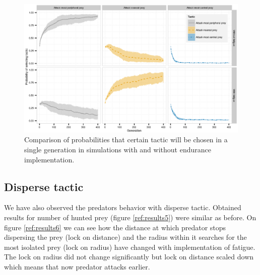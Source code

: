 \documentclass[internal]{FRIreport}
\begin{document}
\begin{figure}[H]
\centering
\includegraphics[scale=0.75]{tactics_graph.eps}
\caption{Comparison of probabilities that certain tactic will be chosen in a single generation in simulations with and without endurance implementation.}
\label{ref:results4}
\end{figure} \hfill 
\subsection{Disperse tactic}
We have also observed the predators behavior with disperse tactic. Obtained results for number of hunted prey (figure \ref{ref:results5}) were similar as before. On figure \ref{ref:results6} we can see how the distance at which predator stops dispersing the prey (lock on distance) and the radius within it searches for the most isolated prey (lock on radius) have changed with implementation of fatigue. The lock on radius did not change significantly but lock on distance scaled down which means that now predator attacks earlier.
\end{document}

